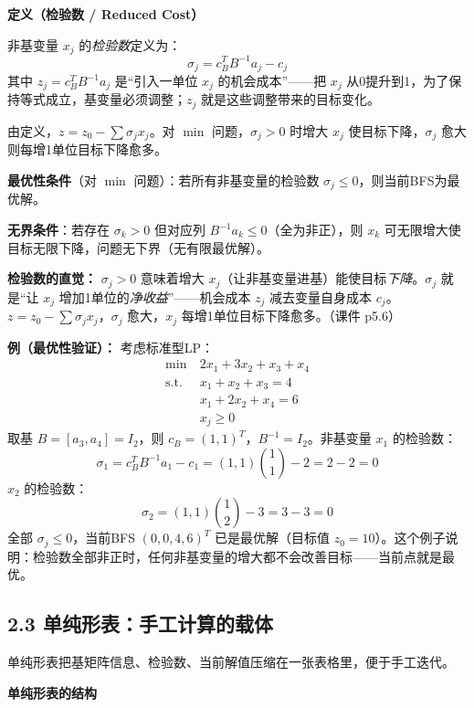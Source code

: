 \textbf{定义（检验数 / Reduced Cost）}

非基变量 $x_j$ 的\emph{检验数}定义为：
\[
\sigma_j = c_B^T B^{-1} a_j - c_j
\]
其中 $z_j = c_B^T B^{-1} a_j$ 是“引入一单位 $x_j$ 的机会成本”——把 $x_j$ 从0提升到1，为了保持等式成立，基变量必须调整；$z_j$ 就是这些调整带来的目标变化。

由定义，$z = z_0 - \sum \sigma_j x_j$。对 $\min$ 问题，$\sigma_j > 0$ 时增大 $x_j$ 使目标下降，$\sigma_j$ 愈大则每增1单位目标下降愈多。

\textbf{最优性条件}（对 $\min$ 问题）：若所有非基变量的检验数 $\sigma_j \le 0$，则当前BFS为最优解。

\textbf{无界条件}：若存在 $\sigma_k > 0$ 但对应列 $B^{-1}a_k \le 0$（全为非正），则 $x_k$ 可无限增大使目标无限下降，问题无下界（无有限最优解）。

\textbf{检验数的直觉：} $\sigma_j > 0$ 意味着增大 $x_j$（让非基变量进基）能使目标\emph{下降}。$\sigma_j$ 就是“让 $x_j$ 增加1单位的\emph{净收益}”——机会成本 $z_j$ 减去变量自身成本 $c_j$。$z = z_0 - \sum \sigma_j x_j$，$\sigma_j$ 愈大，$x_j$ 每增1单位目标下降愈多。（课件 p5.6）

\textbf{例（最优性验证）：} 考虑标准型LP：
\[
\begin{aligned}
\min\ & 2x_1 + 3x_2 + x_3 + x_4 \\
\text{s.t.}\ & x_1 + x_2 + x_3 = 4 \\
& x_1 + 2x_2 + x_4 = 6 \\
& x_j \ge 0
\end{aligned}
\]
取基 $B=[a_3,a_4]=I_2$，则 $c_B=(1,1)^T$，$B^{-1}=I_2$。非基变量 $x_1$ 的检验数：
\[
\sigma_1 = c_B^T B^{-1} a_1 - c_1 = (1,1)\binom{1}{1} - 2 = 2-2 = 0
\]
$x_2$ 的检验数：
\[
\sigma_2 = (1,1)\binom{1}{2} - 3 = 3-3 = 0
\]
全部 $\sigma_j \le 0$，当前BFS $(0,0,4,6)^T$ 已是最优解（目标值 $z_0=10$）。这个例子说明：检验数全部非正时，任何非基变量的增大都不会改善目标——当前点就是最优。

\subsection{2.3 单纯形表：手工计算的载体}

单纯形表把基矩阵信息、检验数、当前解值压缩在一张表格里，便于手工迭代。

\textbf{单纯形表的结构}

